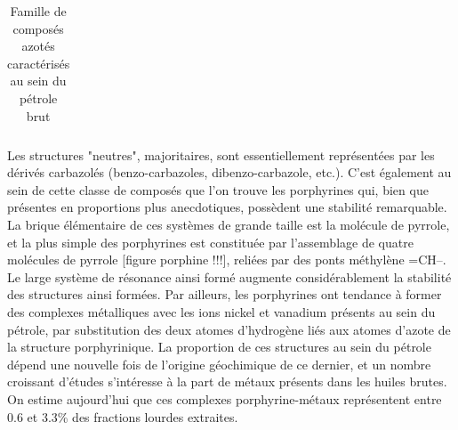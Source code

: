 \documentclass[12pt,a4paper]{book}
\begin{document}
\begin{table}[h!]
\begin{center}
\begin{tabular}{rl}
			\hline 
		\end{tabular}
	\end{center}
	\caption{Famille de composés azotés caractérisés au sein du pétrole brut}
	\label{tab:azote}
\end{table}


Les structures "neutres", majoritaires, sont essentiellement représentées par les dérivés carbazolés (benzo-carbazoles, dibenzo-carbazole, etc.). C'est également au sein de cette classe de composés que l'on trouve les porphyrines qui, bien que présentes en proportions plus anecdotiques, possèdent une stabilité remarquable. La brique élémentaire de ces systèmes de grande taille est la molécule de pyrrole, et la plus simple des porphyrines est constituée par l'assemblage de quatre molécules de pyrrole [figure porphine !!!], reliées par des ponts méthylène =CH--. Le large système de résonance ainsi formé augmente considérablement la stabilité des structures ainsi formées. Par ailleurs, les porphyrines ont tendance à former des complexes métalliques avec les ions nickel et vanadium présents au sein du pétrole, par substitution des deux atomes d'hydrogène liés aux atomes d'azote de la structure porphyrinique. La proportion de ces structures au sein du pétrole dépend une nouvelle fois de l'origine géochimique de ce dernier, et un nombre croissant d'études s'intéresse à la part de métaux présents dans les huiles brutes. On estime aujourd'hui que ces complexes porphyrine-métaux représentent entre 0.6 et 3.3\% des fractions lourdes extraites\cite{merdrignac2007physicochemical, speight2004petroleum}.
\end{document}
